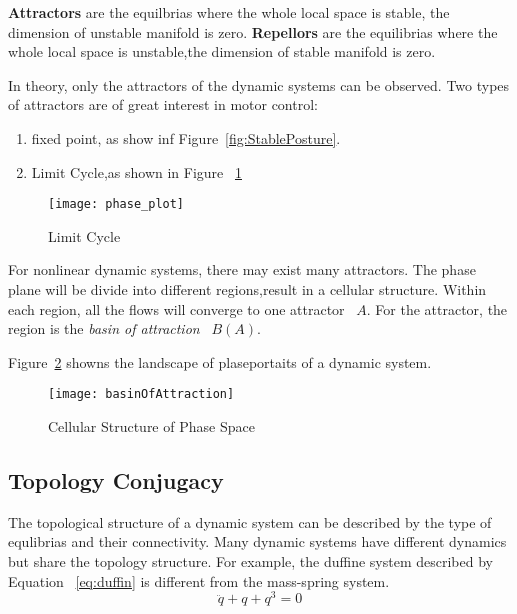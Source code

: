 \textbf{Attractors} are the equilbrias where the whole local space is stable, the dimension of unstable manifold is zero.
\textbf{Repellors} are the equilibrias where the whole local space is unstable,the dimension of stable manifold is zero.







In theory, only the attractors of the dynamic systems can be observed.
Two types of attractors are of great interest in motor control:
\begin{enumerate}
 \item fixed point, as show inf Figure~\ref{fig:StablePosture}.
 \item Limit Cycle,as shown in Figure ~\ref{fig:limit_circle}
\end{enumerate}
\begin{figure}
\begin{center}
\texttt{[image: phase\_plot]}
\caption{Limit Cycle}
\end{center}
\label{fig:limit_circle}
\end{figure}





For nonlinear dynamic systems, there may exist many attractors.
The phase plane will be divide into different regions,result in a cellular structure.
Within each region, all the flows will converge to one attractor ~$A$.
For the attractor, the region is  the \emph{basin of attraction} ~$B(A)$.

Figure~\ref{fig:manyboa} showns the landscape of plaseportaits of a dynamic system.
\begin{figure}
\begin{center}
\texttt{[image: basinOfAttraction]}
\end{center}
\caption{Cellular Structure of Phase Space}
\label{fig:manyboa}
\end{figure}




\subsection{Topology Conjugacy}
The topological structure of a dynamic system can be described by the type of equlibrias and their connectivity.
Many dynamic systems have different dynamics but share the topology structure.
For example, the duffine system described by Equation ~\ref{eq:duffin} is different from the mass-spring system.
\begin{equation}
\label{eq:duffin}
\ddot{q}+q+q^{3}=0
\end{equation}

